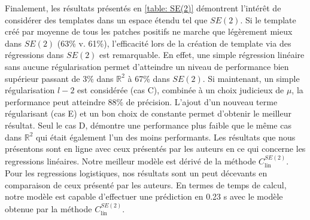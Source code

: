 \documentclass{article}
\begin{document}
Finalement, les résultats présentés en \ref{table: SE(2)} démontrent l'intérêt de considérer des templates dans un espace étendu tel que $SE(2)$.
Si le template créé par moyenne de tous les patches positifs ne marche que légèrement mieux dans $SE(2)$ (63\% v. 61\%), l'efficacité 
lors de la création de template via des régressions dans $SE(2)$ est remarquable. En effet, une simple régression linéaire sans aucune régularisation permet 
d'atteindre un niveau de performance bien supérieur passant de 3\% dans $\mathbb{R}^2$ à 67\% dans $SE(2)$. Si maintenant, 
un simple régularisation $l-2$ est considérée (cas C), combinée à un choix judicieux de $\mu$,  la performance peut atteindre 88\% de précision.
L'ajout d'un nouveau terme régularisant (cas E) et un bon choix de constante permet d'obtenir le meilleur résultat. Seul le cas D, démontre une 
performance plus faible que le même cas dans $\mathbb{R}^2$ qui était également l'un des moins performants. Les résultats que nous présentons sont en ligne avec ceux 
présentés par les auteurs en ce qui concerne les regressions linéaires. Notre meilleur modèle est dérivé de la méthode $C_{\text{lin}}^{SE(2)}$. Pour 
les regressions logistiques, nos résultats sont un peut décevants en comparaison de ceux présenté par les auteurs. 
En termes de temps de calcul, notre modèle est capable d'effectuer une prédiction en 0.23 s avec le modèle obtenue par la méthode $C_{\text{lin}}^{SE(2)}$.
\end{document}
